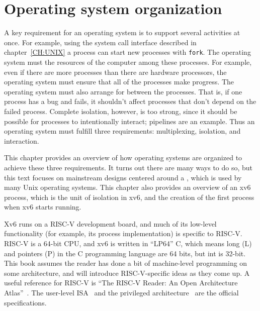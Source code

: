
\chapter{Operating system organization}
\label{CH:FIRST}

A key requirement for an operating system is to support several activities at once.  For
example, using the system call interface described in
chapter~\ref{CH:UNIX}
a process can start new processes with 
\lstinline{fork}.
The operating system must 
the resources of the computer among these processes.
For example, even if there are more processes
than there are hardware processors, the operating
system must ensure that all of the processes
make progress.  The operating system must also arrange for
between the processes.
That is, if one process has a bug and fails, it shouldn't affect processes that
don't depend on the failed process.
Complete isolation, however, is too strong, since it should be possible for
processes to intentionally interact; pipelines are an example.
Thus
an operating system must fulfill three requirements: multiplexing, isolation,
and interaction.

This chapter provides an overview of how operating systems are
organized to achieve these three requirements.  It turns out there are
many ways to do so, but this text focuses on mainstream designs
centered around a , which is used by many
Unix operating systems.  This chapter also provides an overview of an
xv6 process, which is the unit of isolation in xv6, and the
creation of the first process when xv6 starts running.

Xv6 runs on a RISC-V development board, and much of its low-level
functionality (for example, its process implementation) is specific to
RISC-V.  RISC-V is a 64-bit CPU, and xv6 is written in ``LP64'' C,
which means long (L) and pointers (P) in the C programming language
are 64 bits, but int is 32-bit.  This book assumes the reader has done
a bit of machine-level programming on some architecture, and will
introduce RISC-V-specific ideas as they come up.  A useful reference
for RISC-V is ``The RISC-V Reader: An Open Architecture
Atlas''~\cite{riscv}.
The user-level ISA~\cite{riscv:user} and the privileged
architecture~\cite{riscv:priv} are the official specifications.

